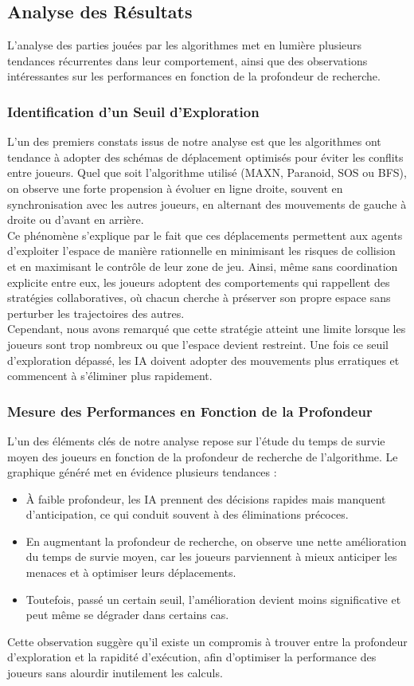 \subsection{Analyse des Résultats}
L'analyse des parties jouées par les algorithmes met en lumière plusieurs tendances récurrentes dans leur comportement, ainsi que des observations intéressantes sur les performances en fonction de la profondeur de recherche.
\subsubsection{Identification d'un Seuil d'Exploration}
L’un des premiers constats issus de notre analyse est que les algorithmes ont tendance à adopter des schémas de déplacement optimisés pour éviter les conflits entre joueurs. Quel que soit l’algorithme utilisé (MAXN, Paranoid, SOS ou BFS), on observe une forte propension à évoluer en ligne droite, souvent en synchronisation avec les autres joueurs, en alternant des mouvements de gauche à droite ou d’avant en arrière. \\
Ce phénomène s’explique par le fait que ces déplacements permettent aux agents d’exploiter l’espace de manière rationnelle en minimisant les risques de collision et en maximisant le contrôle de leur zone de jeu. Ainsi, même sans coordination explicite entre eux, les joueurs adoptent des comportements qui rappellent des stratégies collaboratives, où chacun cherche à préserver son propre espace sans perturber les trajectoires des autres. \\
Cependant, nous avons remarqué que cette stratégie atteint une limite lorsque les joueurs sont trop nombreux ou que l’espace devient restreint. Une fois ce seuil d’exploration dépassé, les IA doivent adopter des mouvements plus erratiques et commencent à s’éliminer plus rapidement.

\subsubsection{Mesure des Performances en Fonction de la Profondeur}
L’un des éléments clés de notre analyse repose sur l’étude du temps de survie moyen des joueurs en fonction de la profondeur de recherche de l’algorithme. Le graphique généré met en évidence plusieurs tendances :
\begin{itemize}
    \item À faible profondeur, les IA prennent des décisions rapides mais manquent d’anticipation, ce qui conduit souvent à des éliminations précoces.
    \item En augmentant la profondeur de recherche, on observe une nette amélioration du temps de survie moyen, car les joueurs parviennent à mieux anticiper les menaces et à optimiser leurs déplacements.
    \item Toutefois, passé un certain seuil, l’amélioration devient moins significative et peut même se dégrader dans certains cas. 
\end{itemize}
Cette observation suggère qu’il existe un compromis à trouver entre la profondeur d’exploration et la rapidité d’exécution, afin d’optimiser la performance des joueurs sans alourdir inutilement les calculs.

